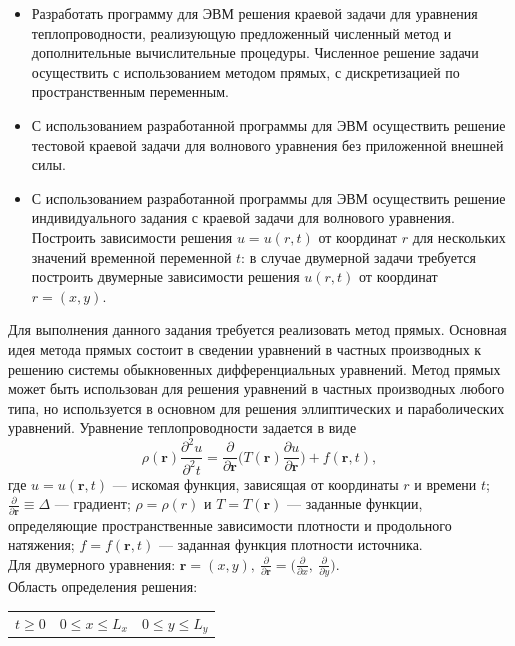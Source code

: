 \documentclass[a4paper,12pt]{article}
\begin{document}
\begin{itemize}
	\item Разработать программу для ЭВМ решения краевой задачи для уравнения теплопроводности, реализующую предложенный численный метод и дополнительные вычислительные процедуры. Численное решение задачи осуществить с использованием методом прямых, с дискретизацией по пространственным переменным. 

	\item  С использованием разработанной программы для ЭВМ осуществить решение тестовой краевой задачи
	для волнового уравнения без приложенной внешней силы.
	\item С использованием разработанной программы для ЭВМ осуществить решение индивидуального задания с краевой задачи для волнового уравнения. Построить зависимости решения $u = u(r, t)$ от координат
	$r$ для нескольких значений временной переменной $t$: в случае двумерной задачи требуется построить
	двумерные зависимости решения $u(r, t)$ от координат $r = (x, y)$. 
\end{itemize}
Для выполнения данного задания требуется реализовать метод прямых. Основная идея метода прямых состоит в сведении уравнений в частных производных к решению системы обыкновенных дифференциальных уравнений. Метод прямых может быть использован для решения уравнений в частных производных любого типа, но используется в основном для решения эллиптических и параболических уравнений.
Уравнение теплопроводности задается в виде
\begin{equation}
  \rho(\textbf{r}) \displaystyle \frac{\partial^2 u}{\partial^2																																																						 t} = \displaystyle \frac{\partial}{\partial \textbf{r}} \biggl( T(\textbf{r}) \displaystyle \frac{\partial u}{\partial \textbf{r}}\biggl) + f(\textbf{r}, t) ,
\end{equation}
где $u = u(\textbf{r}, t)$ — искомая функция, зависящая от координаты $r$ и времени $t$; $\displaystyle \frac{\partial }{\partial \textbf{r}} \equiv \Delta$ — градиент; $\rho = \rho(r)$
и $T = T (\textbf{r})$ — заданные функции, определяющие пространственные зависимости плотности и продольного натяжения; $f = f(\textbf{r}, t)$ — заданная функция плотности источника.
\\
Для двумерного уравнения: $\textbf{r} = (x, y), \ \displaystyle  \frac{\partial }{\partial \textbf{r}} = \biggl(\frac{\partial }{\partial x},\  \frac{\partial }{\partial y} \biggl)$.\\
Область определения решения:
\begin{center}
	\begin{tabular}{c c c }
		$	t \geq 0 $&
		$	0 \leq x \leq L_x $&
		$	0 \leq y \leq L_y$
	\end{tabular}
\end{center}
\end{document}
